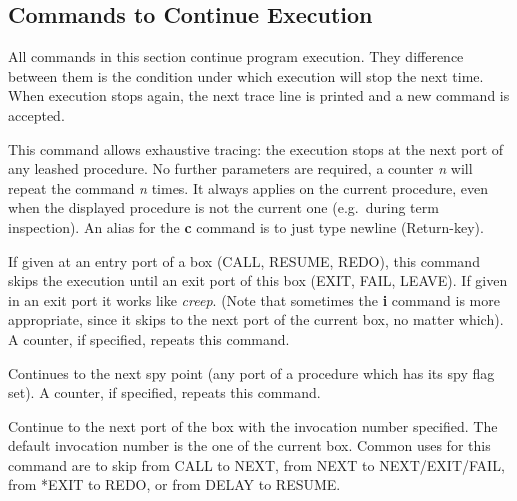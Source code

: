\subsection{Commands to Continue Execution}
All commands in this section continue program execution.
They difference between them is the condition under which execution
will stop the next time.  When execution stops again, the next trace
line is printed and a new command is accepted.

\begin{descr}{1cm}

This command allows exhaustive tracing: the execution stops at the
next port of any leashed procedure.  No further parameters are
required, a counter {\it n} will repeat the command {\it n} times.
It always applies on the current procedure, even when the displayed
procedure is not the current one (e.g.\ during term inspection).
An alias for the {\bf c} command is to just type newline (Return-key).

If given at an entry port of a box (CALL, RESUME, REDO), this command skips
the execution until an exit port of this box (EXIT, FAIL, LEAVE).
If given in an exit port it works like {\it creep}.
(Note that sometimes the {\bf i} command is more appropriate, since it
skips to the next port of the current box, no matter which).
A counter, if specified, repeats this command.


Continues to the next spy point (any port of a procedure
which has its spy flag set).
A counter, if specified, repeats this command.

Continue to the next port of the box with the invocation number
specified. The default invocation number is the one of the current box.
Common uses for this command are to skip from CALL to NEXT, from NEXT
to NEXT/EXIT/FAIL, from *EXIT to REDO, or from DELAY to RESUME.


\end{descr}
